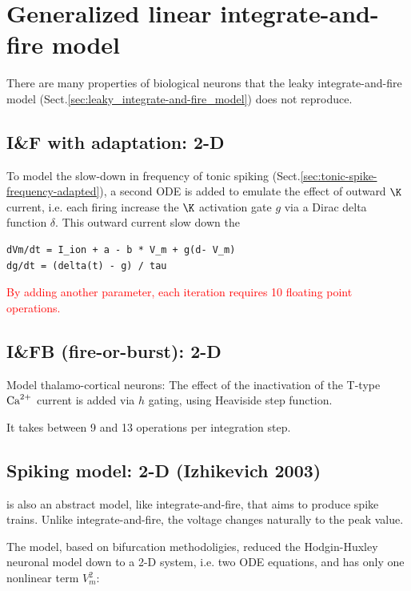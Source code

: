 \section{Generalized linear integrate-and-fire model}

There are many properties of biological neurons that the leaky
integrate-and-fire model (Sect.\ref{sec:leaky_integrate-and-fire_model}) does
not reproduce.

\subsection{I\&F with adaptation: 2-D}

To model the slow-down in frequency of tonic spiking
(Sect.\ref{sec:tonic-spike-frequency-adapted}), a second ODE is added to emulate
the effect of outward $\K$ current, i.e. each firing increase the $\K$
activation gate $g$ via a Dirac delta function $\delta$. This outward current
slow down the 
\begin{verbatim}
dVm/dt = I_ion + a - b * V_m + g(d- V_m)
dg/dt = (delta(t) - g) / tau
\end{verbatim}

\textcolor{red}{By adding another parameter, each iteration requires
10 floating point operations.}

\subsection{I\&FB (fire-or-burst): 2-D}

Model thalamo-cortical neurons: The effect of the inactivation of the T-type
${\text{Ca}^{2+}}$ current is added via $h$ gating, using Heaviside step function.

It takes between 9 and 13 operations per integration step.

\subsection{Spiking model: 2-D (Izhikevich 2003)}
\label{sec:Spiking-model}
\label{sec:Izhikevich-2003}

\citep{izhikevich2003} is also an abstract model, like integrate-and-fire, that
aims to produce spike trains. Unlike integrate-and-fire, the voltage changes
naturally to the peak value.

The model, based on bifurcation methodoligies, reduced the Hodgin-Huxley
neuronal model down to a 2-D system, i.e. two ODE equations, and has only one
nonlinear term $V_m^2$:


